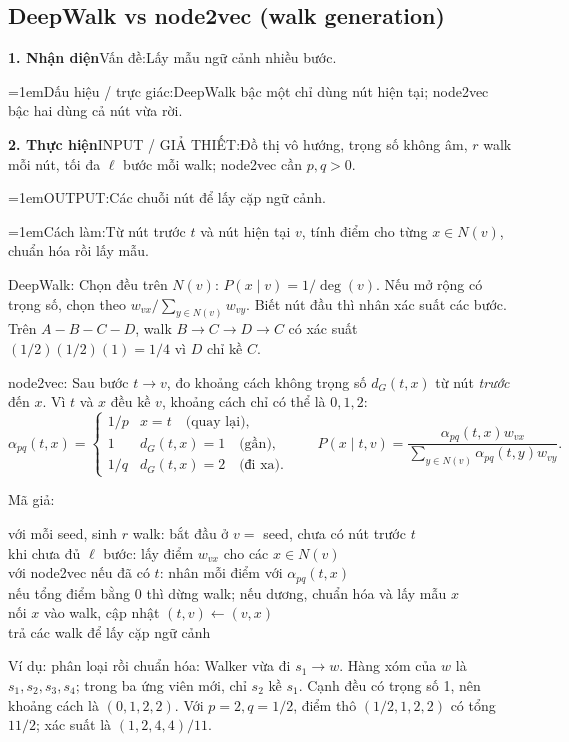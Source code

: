 \documentclass[10pt,a4paper,twocolumn]{article}
\makeatletter
\newif\ifexamheadingprinted
\newcommand{\topic}[2]{%
  \global\examheadingprintedfalse\par\subsection{#2}\label{topic:#1}}
\newcommand{\key}[1]{#1:\enspace}
\newcommand{\algfield}[2]{\par\noindent\hangindent=1em\relax#1:\enspace#2}
\newcommand{\unitfield}[4]{%
  \par\noindent\textbf{#1. #2}\enspace #3:\enspace #4}
\newcommand{\algsummary}[6]{%
  \begingroup\setlength{\parskip}{1pt}%
  \unitfield{1}{Nhận diện}{Vấn đề}{#1}%
  \algfield{Dấu hiệu / trực giác}{#2}%
  \if\relax\detokenize{#3}\relax\else\par\noindent#3\par\fi%
  \unitfield{2}{Thực hiện}{INPUT / GIẢ THIẾT}{#4}%
  \algfield{OUTPUT}{#5}%
  \algfield{Cách làm}{#6}\par\endgroup}
\newenvironment{algpseudo}{%
  \par\addvspace{2pt}\noindent
  \setlength{\parskip}{0pt}%
  Mã giả:\par\nobreak
  \begin{list}{}{\setlength{\leftmargin}{1em}\setlength{\topsep}{0pt}%
    \setlength{\partopsep}{0pt}\setlength{\parsep}{0pt}%
    \@beginparpenalty=10000\relax}%
  \item\relax
}{\end{list}\par\addvspace{3pt}}
\makeatother
\begin{document}
\topic{node2vec}{DeepWalk vs node2vec (walk generation)}

\algsummary{Lấy mẫu ngữ cảnh nhiều bước.}{DeepWalk bậc một chỉ dùng nút hiện tại; node2vec bậc hai dùng cả nút vừa rời.}{}{Đồ thị vô hướng, trọng số không âm, $r$ walk mỗi nút, tối đa $\ell$ bước mỗi walk; node2vec cần $p,q>0$.}{Các chuỗi nút để lấy cặp ngữ cảnh.}{Từ nút trước $t$ và nút hiện tại $v$, tính điểm cho từng $x\in N(v)$, chuẩn hóa rồi lấy mẫu.}

\key{DeepWalk} Chọn đều trên $N(v)$: $P(x\mid v)=1/\deg(v)$. Nếu mở rộng có trọng số, chọn theo $w_{vx}/\sum_{y\in N(v)}w_{vy}$. Biết nút đầu thì nhân xác suất các bước. Trên $A-B-C-D$, walk $B\to C\to D\to C$ có xác suất $(1/2)(1/2)(1)=1/4$ vì $D$ chỉ kề $C$.

\key{node2vec} Sau bước $t\to v$, đo khoảng cách không trọng số $d_G(t,x)$ từ nút \emph{trước} đến $x$. Vì $t$ và $x$ đều kề $v$, khoảng cách chỉ có thể là $0,1,2$:
\[
\alpha_{pq}(t,x)=
\begin{cases}
1/p & x=t \quad\text{(quay lại)},\\
1 & d_G(t,x)=1 \quad\text{(gần)},\\
1/q & d_G(t,x)=2 \quad\text{(đi xa)}.
\end{cases}
\qquad
P(x\mid t,v)=\frac{\alpha_{pq}(t,x)w_{vx}}
{\sum_{y\in N(v)}\alpha_{pq}(t,y)w_{vy}}.
\]

\noindent\begin{minipage}{\linewidth}
\begin{algpseudo}
với mỗi seed, sinh $r$ walk: bắt đầu ở $v=$ seed, chưa có nút trước $t$\\
\quad khi chưa đủ $\ell$ bước: lấy điểm $w_{vx}$ cho các $x\in N(v)$\\
\quad với node2vec nếu đã có $t$: nhân mỗi điểm với $\alpha_{pq}(t,x)$\\
\quad nếu tổng điểm bằng 0 thì dừng walk; nếu dương, chuẩn hóa và lấy mẫu $x$\\
\quad nối $x$ vào walk, cập nhật $(t,v)\gets(v,x)$\\
trả các walk để lấy cặp ngữ cảnh
\end{algpseudo}
\end{minipage}\par

\key{Ví dụ: phân loại rồi chuẩn hóa} Walker vừa đi $s_1\to w$. Hàng xóm của $w$ là $s_1,s_2,s_3,s_4$; trong ba ứng viên mới, chỉ $s_2$ kề $s_1$. Cạnh đều có trọng số 1, nên khoảng cách là $(0,1,2,2)$. Với $p=2,q=1/2$, điểm thô $(1/2,1,2,2)$ có tổng $11/2$; xác suất là $(1,2,4,4)/11$.
\end{document}
